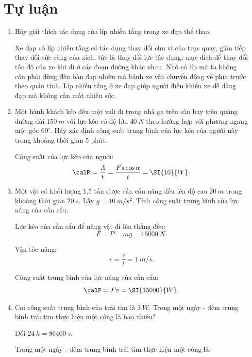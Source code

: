 \section{Tự luận}
\begin{enumerate}[label=\bfseries Câu \arabic*:, leftmargin=1.5cm]
	\item {}
	
	
	{
		Hãy giải thích tác dụng của líp nhiều tầng trong xe đạp thể thao.
	}
	
	\hideall
	{	
		Xe đạp có líp nhiều tầng có tác dụng thay đổi chu vi của trục quay, gián tiếp thay đổi sức căng của xích, tức là thay đổi lực tác dụng, mục đích để thay đổi tốc độ của xe khi đi ở các đoạn đường khác nhau. Nhờ có líp mà ta không cần phải dùng đến bàn đạp nhiều mà bánh xe vẫn chuyển động về phía trước theo quán tính. Líp nhiều tầng ở xe đạp giúp người điều khiển xe dễ dàng đạp mà không cần mất nhiều sức. 
	}
	\item {}
	
	
	{
		Một hành khách kéo đều một vali đi trong nhà ga trên sân bay trên quãng đường dài $\SI{150}{m}$ với lực kéo có độ lớn $\SI{40}{N}$ theo hướng hợp với phương ngang một góc $60^\circ$. Hãy xác định công suất trung bình của lực kéo của người này trong khoảng thời gian 5 phút.
	}
	
	\hideall
	{	
		Công suất của lực kéo của người:
		$$\calP = \dfrac{A}{t} = \dfrac{Fs\cos \alpha}{t}= \SI{10}{W}.$$
	}
	
	\item {}
	
	
	{
		Một vật có khối lượng 1,5 tấn được cần cẩu nâng đều lên độ cao $\SI{20}{m}$ trong khoảng thời gian $\SI{20}{s}$. Lấy $g=\SI{10}{m/s^2}$. Tính công suất trung bình của lực nâng của cần cẩu.
	}
	
	\hideall
	{	
		Lực kéo của cần cẩu để nâng vật đi lên thẳng đều:
		$$F=P=mg=\SI{15000}{N}.$$
		
		Vận tốc nâng:
		$$v=\dfrac{s}{t} = \SI{1}{m/s}.$$
		
		Công suất trung bình của lực nâng của cần cẩu:
		$$\calP = Fv = \SI{15000}{W}.$$
	}
	\item {}
	
	
	{
		Coi công suất trung bình của trái tim là $\SI{3}{W}$. Trong một ngày - đêm trung bình trái tim thực hiện một công là bao nhiêu?
	}
	
	\hideall
	{	Đổi $\SI{24}{h} = \SI{86400}{s}.$
		
		Trong một ngày - đêm trung bình trái tim thực hiện một công là:
		
}
\end{enumerate}
